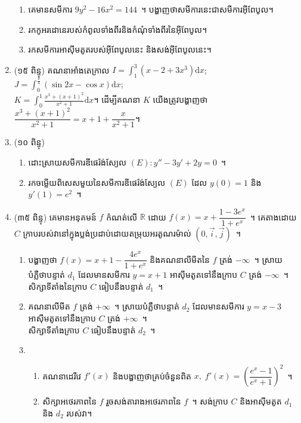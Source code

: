\documentclass{xam}
\begin{document}
\begin{enumerate}
\begin{enumerate}
      \item គេមានសមីការ $ 9y^2-16x^2=144 $~។ បង្ហាញថាសមីការនេះជាសមីការអ៊ីពែបូល។
      \item[] រកកូអរដោនេរបស់កំពូលទាំងពីរនិងកំណុំទាំងពីរនៃអ៊ីពែបូល។
      \item[] រកសមីការអាស៊ីមតូតរបស់អ៊ីពែបូលនេះ និងសង់អ៊ីពែបូលនេះ។
    \end{enumerate}
    \item (១៥ ពិន្ទុ) គណនាអាំងតេក្រាល $ I=\displaystyle\int_{1}^{3}\left(x-2+3x^3\right)\mathrm{d}x $; $ J=\displaystyle\int_{0}^{\frac{\pi}{4}}\left(\sin 2x-\cos x\right)\mathrm{d}x $; \\
    $ K=\displaystyle\int_{0}^{1}\frac{x^3+(x+1)^2}{x^2+1}\mathrm{d}x $។ ដើម្បីគណនា $ K $ យើងត្រូវបង្ហាញថា $ \dfrac{x^3+(x+1)^2}{x^2+1}=x+1+\dfrac{x}{x^2+1} $។
    \item (១០ ពិន្ទុ)
    \begin{enumerate}
      \item ដោះស្រាយសមីការឌីផេរ៉ង់ស្យែល $ (E): y''-3y'+2y=0 $~។
      \item រកចម្លើយពិសេសមួយនៃសមីការឌីផេរ៉ង់ស្យែល $ (E) $ ដែល $ y(0)=1 $ និង $ y'(1)=e^2 $~។
    \end{enumerate}
    \item (៣៥ ពិន្ទុ) គេមានអនុគមន៍ $ f $ កំណត់លើ $ \mathbb{R} $ ដោយ $ f(x)=x+\dfrac{1-3e^x}{1+e^x} $~។ គេតាងដោយ $ C $ ក្រាបរបស់វានៅក្នុងប្លង់ប្រដាប់ដោយតម្រុយអរតូណរម៉ាល់ $ (0,\vec{i},\vec{j}) $~។
    \begin{enumerate}
      \item បង្ហាញថា $ f(x)=x+1-\dfrac{4e^x}{1+e^x} $ និងគណនាលីមីតនៃ $ f $ ត្រង់ $ -\infty $~។ ស្រាយបំភ្លឺថាបន្ទាត់ $ d_1 $ ដែលមានសមីការ $ y=x+1 $ អាស៊ីមតូតទៅនឹងក្រាប $ C $ ត្រង់ $ -\infty $~។ សិក្សាទីតាំងនៃក្រាប $ C $ ធៀបនឹងបន្ទាត់ $ d_1 $~។
      \item គណនាលីមីត $ f $ ត្រង់ $ +\infty $~។ ស្រាយបំភ្លឺថាបន្ទាត់ $ d_2 $ ដែលមានសមីការ $ y=x-3 $ អាស៊ីមតូតទៅនឹងក្រាប $ C $ ត្រង់ $ +\infty $~។\\
      សិក្សាទីតាំងក្រាប $ C $ ធៀបនឹងបន្ទាត់ $ d_2 $~។
      \item 
      \begin{enumerate}
        \item គណនាដេរីវេ $ f'(x) $ និងបង្ហាញថាគ្រប់ចំនួនពិត $ x,\; f'(x)=\left(\dfrac{e^x-1}{e^x+1}\right)^2 $~។
        \item សិក្សាអថេរភាពនៃ $ f $ រួចសង់តារាងអថេរភាពនៃ $ f $~។ សង់ក្រាប $ C $ និងអាស៊ីមតូត $ d_1 $ និង $ d_2 $ របស់វា។
      \end{enumerate}
    \end{enumerate}
  \end{enumerate}
\end{document}
